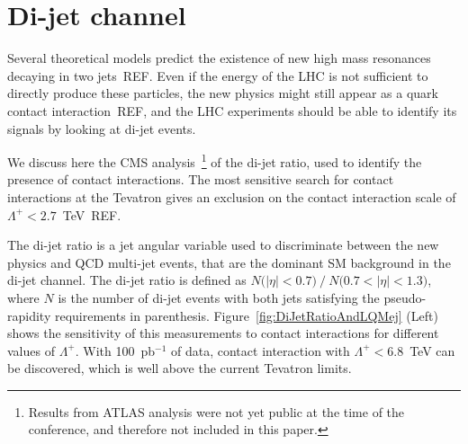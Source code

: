 \documentclass{cimento}
\begin{document}
\section{Di-jet channel} \label{dijet}
Several theoretical models predict the existence of new 
high mass resonances decaying in two jets~REF.
Even if the energy of the LHC is not sufficient to directly produce 
these particles, the new physics might still appear as 
a quark contact interaction~REF, and the LHC experiments should 
be able to identify its signals by looking at di-jet events.

We discuss here the CMS analysis~\footnote{Results 
from ATLAS analysis were not yet public at the time 
of the conference, and therefore not included in this paper.}
of the di-jet ratio, used to identify the presence of contact interactions. 
The most sensitive search for contact interactions at the Tevatron 
gives an exclusion on the contact interaction scale 
of $\Lambda^{+} < 2.7$~TeV~REF.  

The di-jet ratio is a jet angular variable used to 
discriminate between the new physics and QCD multi-jet events, 
that are the dominant SM background in the di-jet channel. The di-jet ratio is 
defined as $N\mbox{(}|\eta|<0.7\mbox{)}~/~N\mbox{(}0.7<|\eta|< 1.3 \mbox{)}$, 
where $N$ is the number of di-jet events with both jets satisfying the 
pseudo-rapidity requirements in parenthesis. 
Figure~\ref{fig:DiJetRatioAndLQMej} (Left) shows the sensitivity of this 
measurements to contact interactions for different values of $\Lambda^{+}$. 
With 100~pb$^{-1}$ of data, contact interaction with
$\Lambda^{+} < 6.8$~TeV can be discovered, which is well above the 
current Tevatron limits.
 
\end{document}
